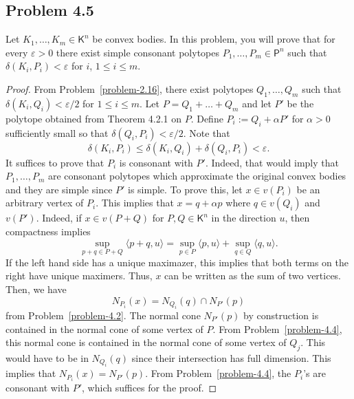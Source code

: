 \documentclass[12pt]{article}
\begin{document}
\newpage

\subsection{Problem 4.5}

\begin{problem}
	Let $K_1, \ldots, K_m \in \mathsf{K}^n$ be convex bodies. In this problem, you will prove that for every $\varepsilon > 0$ there exist simple consonant polytopes $P_1, \ldots, P_m \in \mathsf{P}^n$ such that $\delta(K_i, P_i) < \varepsilon$ for $i$, $1 \leq i \leq m$.
\end{problem}

\begin{proof}
	From Problem~\ref{problem-2.16}, there exist polytopes $Q_1, \ldots, Q_m$ such that $\delta (K_i, Q_i) < \varepsilon/ 2$ for $1 \leq i \leq m$. Let $P = Q_1 + \ldots + Q_m$ and let $P'$ be the polytope obtained from Theorem 4.2.1 on $P$. Define $P_i := Q_i + \alpha P'$ for $\alpha > 0$ sufficiently small so that $\delta(Q_i, P_i) < \varepsilon / 2$. Note that 
	\[
		\delta(K_i, P_i) \leq \delta(K_i, Q_i) + \delta(Q_i, P_i) < \varepsilon. 
	\]
	It suffices to prove that $P_i$ is consonant with $P'$. Indeed, that would imply that $P_1, \ldots, P_m$ are consonant polytopes which approximate the original convex bodies and they are simple since $P'$ is simple. To prove this, let $x \in v(P_i)$ be an arbitrary vertex of $P_i$. This implies that $x = q + \alpha p$ where $q \in v(Q_i)$ and $v(P')$. Indeed, if $x \in v(P + Q)$ for $P, Q \in \mathsf{K}^n$ in the direction $u$, then compactness implies 
	\[
		\sup_{p+q \in P + Q} \langle p+q, u \rangle = \sup_{p \in P} \langle p, u \rangle + \sup_{q \in Q} \langle q, u \rangle.
	\]
	If the left hand side has a unique maximazer, this implies that both terms on the right have unique maximers. Thus, $x$ can be written as the sum of two vertices. Then, we have 
	\[
		N_{P_i}(x) = N_{Q_i}(q) \cap N_{P'}(p)
	\] 
	from Problem~\ref{problem-4.2}. The normal cone $N_{P'}(p)$ by construction is contained in the normal cone of some vertex of $P$. From Problem~\ref{problem-4.4}, this normal cone is contained in the normal cone of some vertex of $Q_j$. This would have to be in $N_{Q_i}(q)$ since their intersection has full dimension. This implies that $N_{P_i}(x) = N_{P'}(p)$. From Problem~\ref{problem-4.4}, the $P_i$'s are consonant with $P'$, which suffices for the proof.
\end{proof}

\newpage
\end{document}
